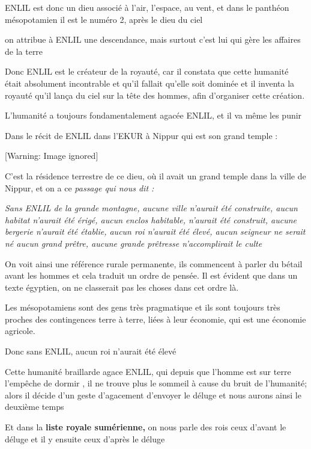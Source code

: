 \documentclass[a4paper,10pt]{article}
\begin{document}
ENLIL est donc un dieu associé à l'air,
l'espace, au vent, et dans le panthéon mésopotamien il
est le numéro 2, après le dieu du ciel

on attribue à ENLIL une descendance, mais surtout c'est
lui qui gère les affaires de la terre

Donc ENLIL est le créateur de la royauté, car il constata que cette
humanité était absolument incontrable et qu'il fallait
qu'elle soit dominée et il inventa la royauté
qu'il lança du ciel sur la tête des hommes, afin
d'organiser cette création. 

L'humanité a toujours fondamentalement agacée ENLIL, 
et il va même les punir

Dans le récit de ENLIL dans l'EKUR à Nippur qui est son
grand temple :

  [Warning: Image ignored] %
 

C'est la résidence terrestre de ce dieu, où il avait un
grand temple dans la ville de Nippur, et on a ce \textit{passage qui
nous dit :}

\textit{{\textquotedbl}Sans ENLIL de la grande montagne, aucune ville
n'aurait été construite, aucun habitat
n'aurait été érigé, aucun enclos habitable,
n'aurait été construit, aucune bergerie
n'aurait été établie, aucun roi
n'aurait été élevé, aucun seigneur ne serait  né aucun
grand prêtre, aucune grande prêtresse n'accomplirait
le culte} {\textquotedbl} 

On voit ainsi une référence rurale permanente, ils commencent à parler
du bétail avant les hommes et cela traduit un ordre de pensée. Il est
évident que dans un texte égyptien, on ne classerait pas les choses
dans cet ordre là.

Les mésopotamiens sont des gens très pragmatique et ils sont toujours
très proches des contingences  terre à terre, liées à leur économie,
qui est une économie agricole.

Donc sans ENLIL, aucun roi n'aurait été élevé

Cette humanité braillarde agace ENLIL, qui depuis que
l'homme est sur terre l'empêche de
dormir , il ne trouve plus le sommeil à cause du bruit de
l'humanité; alors il décide d'un
geste d'agacement d'envoyer le déluge
et nous aurons ainsi le deuxième temps

Et dans la \textbf{liste royale sumérienne,} on nous parle des rois
{\textquotedbl} ceux d'avant le déluge{\textquotedbl}
et il y ensuite ceux {\textquotedbl} d'après le déluge
{\textquotedbl}
\end{document}
